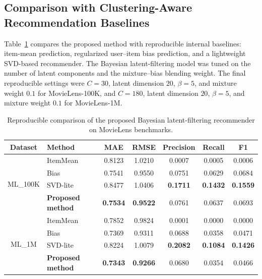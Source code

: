 \documentclass{article}
\theoremstyle{plain}
\theoremstyle{definition}
\theoremstyle{remark}
\begin{document}
\subsection{Comparison with Clustering-Aware Recommendation Baselines}
\label{subsec:baseline_comparison}

Table~\ref{tab:comparison_results} compares the proposed method with reproducible internal baselines: item-mean prediction, regularized user--item bias prediction, and a lightweight SVD-based recommender. The Bayesian latent-filtering model was tuned on the number of latent components and the mixture--bias blending weight. The final reproducible settings were \(C=30\), latent dimension \(20\), \(\beta=5\), and mixture weight \(0.1\) for MovieLens-100K, and \(C=180\), latent dimension \(20\), \(\beta=5\), and mixture weight \(0.1\) for MovieLens-1M.

\begin{table}[htbp]
	\centering
	\caption{Reproducible comparison of the proposed Bayesian latent-filtering recommender on MovieLens benchmarks.}
	\label{tab:comparison_results}
	\renewcommand{\arraystretch}{1.3}
	\setlength{\tabcolsep}{3pt}
	\begin{tabular}{clccccc}
		\hline
		\textbf{Dataset} & \textbf{Method} & \textbf{MAE} & \textbf{RMSE} & \textbf{Precision} & \textbf{Recall} & \textbf{F1} \\
		\hline
		
		\multirow{4}{*}{ML\_100K}
		& ItemMean & 0.8123 & 1.0210 & 0.0007 & 0.0005 & 0.0006 \\
		& Bias & 0.7541 & 0.9550 & 0.0751 & 0.0629 & 0.0684 \\
		& SVD-lite & 0.8477 & 1.0406 & \textbf{0.1711} & \textbf{0.1432} & \textbf{0.1559} \\
		& \textbf{Proposed method} & \textbf{0.7534} & \textbf{0.9522} & 0.0761 & 0.0637 & 0.0693 \\
		\hline
		
		\multirow{4}{*}{ML\_1M}
		& ItemMean & 0.7852 & 0.9824 & 0.0001 & 0.0000 & 0.0000 \\
		& Bias & 0.7369 & 0.9311 & 0.0688 & 0.0358 & 0.0471 \\
		& SVD-lite & 0.8224 & 1.0079 & \textbf{0.2082} & \textbf{0.1084} & \textbf{0.1426} \\
		& \textbf{Proposed method} & \textbf{0.7343} & \textbf{0.9266} & 0.0680 & 0.0354 & 0.0466 \\
		\hline
	\end{tabular}
\end{table}
\end{document}

